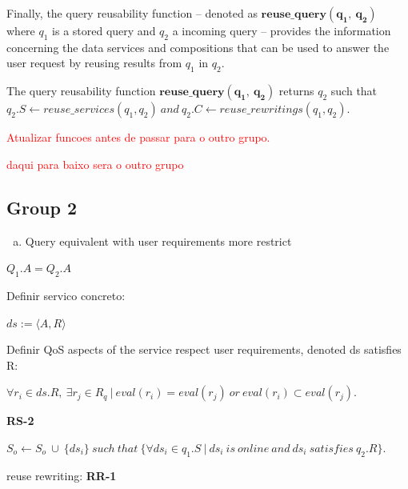 Finally, the query reusability function -- denoted as $\mathbf{reuse\_query(q_{1}, \ q_{2})}$ where $q_{1}$ is a stored query and $q_{2}$ a incoming query -- provides the information concerning the data services and compositions that can be used to answer the user request by reusing results from $q_{1}$ in $q_{2}$. 

\begin{definition}
The query reusability function $\mathbf{reuse\_query(q_{1}, \ q_{2})}$ returns $q_{2}$ such that $q_{2}.S \leftarrow reuse\_services(q_{1}, q_{2}) \ and \ q_{2}.C \leftarrow reuse\_rewritings(q_{1}, q_{2})$.
\end{definition}

\textcolor{red}{Atualizar funcoes antes de passar para o outro grupo.}

\textcolor{red}{daqui para baixo sera o outro grupo}

\subsection{Group 2}

\begin{enumerate}[a)]
\item Query equivalent with user requirements more restrict
\end{enumerate}

\begin{definition}
$Q_{1}.A = Q_{2}.A$
\end{definition}

\begin{definition}
Definir servico concreto: 
\begin{center}
$ds := \langle A, R  \rangle$
\end{center}
\end{definition}

\begin{definition}
Definir QoS aspects of the service respect user requirements, denoted ds satisfies R: 
\begin{center}
$\forall r_{i} \in ds.R, \ \exists r_{j} \in R_{q} \ \vert \ eval (r_{i}) = eval(r_{j}) \ or \ eval (r_{i}) \subset eval(r_{j})$.
\end{center}
\end{definition}

\begin{definition}\label{def:??}
\textbf{RS-2}
\begin{center}
$ S_{o} \leftarrow S_{o} \ \cup \ \lbrace ds_{i} \rbrace\ such\ that\ \lbrace \forall ds_{i} \in q_{1}.S \ \vert \ ds_{i} \ is \ online\ and\ ds_{i}\ satisfies\ q_{2}.R \rbrace$.
\end{center}
reuse rewriting: \textbf{RR-1}
\end{definition}

